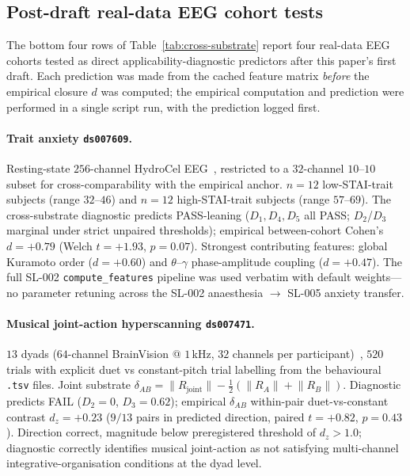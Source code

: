 \documentclass[11pt,a4paper]{article}
\begin{document}
\subsection{Post-draft real-data EEG cohort tests}\label{sec:discussion-postdraft}

The bottom four rows of Table~\ref{tab:cross-substrate} report four real-data EEG cohorts tested as direct applicability-diagnostic predictors after this paper's first draft. Each prediction was made from the cached feature matrix \emph{before} the empirical closure $d$ was computed; the empirical computation and prediction were performed in a single script run, with the prediction logged first.

\paragraph{Trait anxiety \texttt{ds007609}.} Resting-state $256$-channel HydroCel EEG~\citep{ShalamberidzeAnxiety2025}, restricted to a $32$-channel $10$--$10$ subset for cross-comparability with the empirical anchor. $n = 12$ low-STAI-trait subjects (range $32$--$46$) and $n = 12$ high-STAI-trait subjects (range $57$--$69$). The cross-substrate diagnostic predicts PASS-leaning ($D_1, D_4, D_5$ all PASS; $D_2$/$D_3$ marginal under strict unpaired thresholds); empirical between-cohort Cohen's $d = +0.79$ (Welch $t = +1.93$, $p = 0.07$). Strongest contributing features: global Kuramoto order ($d = +0.60$) and $\theta$--$\gamma$ phase-amplitude coupling ($d = +0.47$). The full SL-002 \texttt{compute\_features} pipeline was used verbatim with default weights---no parameter retuning across the SL-002 anaesthesia $\to$ SL-005 anxiety transfer.

\paragraph{Musical joint-action hyperscanning \texttt{ds007471}.} $13$ dyads ($64$-channel BrainVision @ $1$\,kHz, $32$ channels per participant)~\citep{ZhouHyperscanning2026}, $520$ trials with explicit duet vs constant-pitch trial labelling from the behavioural \texttt{.tsv} files. Joint substrate $\delta_{AB} = \lVert R_{\mathrm{joint}}\rVert - \tfrac{1}{2}(\lVert R_A\rVert + \lVert R_B\rVert)$. Diagnostic predicts FAIL ($D_2 = 0$, $D_3 = 0.62$); empirical $\delta_{AB}$ within-pair duet-vs-constant contrast $d_z = +0.23$ ($9/13$ pairs in predicted direction, paired $t = +0.82$, $p = 0.43$). Direction correct, magnitude below preregistered threshold of $d_z > 1.0$; diagnostic correctly identifies musical joint-action as not satisfying multi-channel integrative-organisation conditions at the dyad level.
\end{document}
